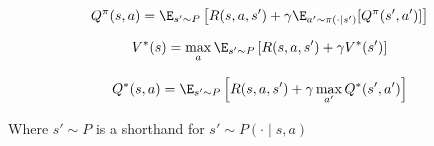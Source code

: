 \begin{equation}
    Q^{\pi}(s, a) = \E_{s' \sim P}\left[R(s, a, s') + \gamma \E_{a'\sim \pi(\cdot \mid s')}[Q^{\pi}(s', a')] \right]
\label{eq:bellman-q}
\end{equation}

\begin{equation}
    V^*(s) = \max_a \E_{s' \sim P}\left[R(s, a, s') + \gamma V^*(s')\right]
\label{eq:bellman-v*}
\end{equation}

\begin{equation}
    Q^*(s, a) = \E_{s' \sim P}\left[R(s, a, s') + \gamma \max_{a'} Q^*(s', a')\right]
\label{eq:bellman-q*}
\end{equation}

Where $s' \sim P$ is a shorthand for $s' \sim P(\cdot\mid s,a)$